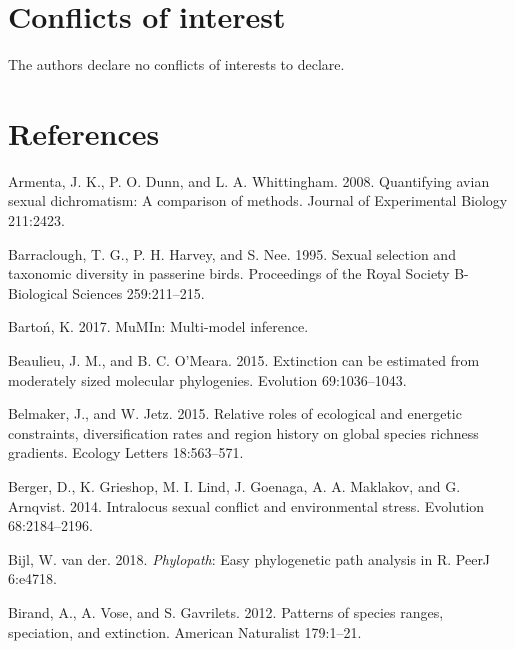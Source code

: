 \documentclass[]{article}
\begin{document}

\hypertarget{conflicts-of-interest}{%
\section{Conflicts of interest}\label{conflicts-of-interest}}

The authors declare no conflicts of interests to declare.

\newpage{}

\hypertarget{references}{%
\section{References}\label{references}}

\hypertarget{refs}{}
\leavevmode\hypertarget{ref-Armenta_2008}{}%
Armenta, J. K., P. O. Dunn, and L. A. Whittingham. 2008. Quantifying
avian sexual dichromatism: A comparison of methods. Journal of
Experimental Biology 211:2423.

\leavevmode\hypertarget{ref-Barraclough_1995}{}%
Barraclough, T. G., P. H. Harvey, and S. Nee. 1995. Sexual selection and
taxonomic diversity in passerine birds. Proceedings of the Royal Society
B-Biological Sciences 259:211--215.

\leavevmode\hypertarget{ref-MuMIn_2017}{}%
Bartoń, K. 2017. MuMIn: Multi-model inference.

\leavevmode\hypertarget{ref-Beaulieu_2015}{}%
Beaulieu, J. M., and B. C. O'Meara. 2015. Extinction can be estimated
from moderately sized molecular phylogenies. Evolution 69:1036--1043.

\leavevmode\hypertarget{ref-Belmaker_2015}{}%
Belmaker, J., and W. Jetz. 2015. Relative roles of ecological and
energetic constraints, diversification rates and region history on
global species richness gradients. Ecology Letters 18:563--571.

\leavevmode\hypertarget{ref-Berger_2014}{}%
Berger, D., K. Grieshop, M. I. Lind, J. Goenaga, A. A. Maklakov, and G.
Arnqvist. 2014. Intralocus sexual conflict and environmental stress.
Evolution 68:2184--2196.

\leavevmode\hypertarget{ref-Wouter_2018}{}%
Bijl, W. van der. 2018. \emph{Phylopath}: Easy phylogenetic path
analysis in R. PeerJ 6:e4718.

\leavevmode\hypertarget{ref-Birand_2012}{}%
Birand, A., A. Vose, and S. Gavrilets. 2012. Patterns of species ranges,
speciation, and extinction. American Naturalist 179:1--21.
\end{document}

